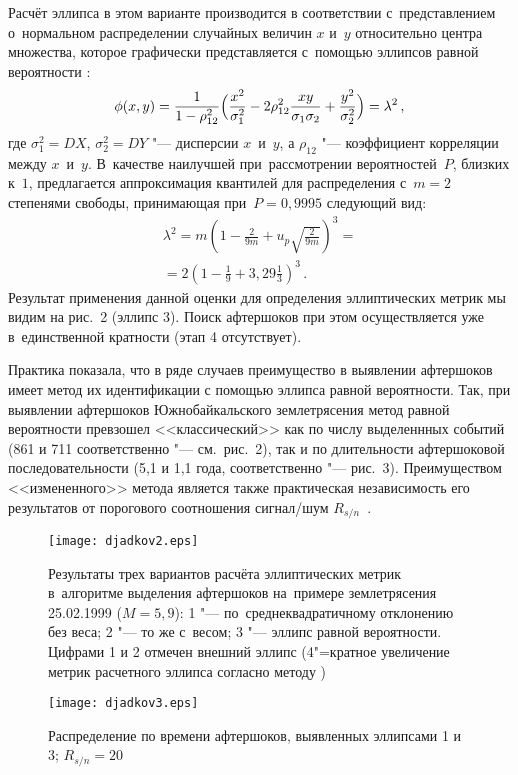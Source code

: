 \documentclass[twoside]{article}
\begin{document}
Расчёт эллипса в этом варианте производится в соответствии с~представлением о~нормальном
распределении случайных величин $x$ и~$y$ относительно центра множества, которое графически
представля\-ется с~помощью эллипсов равной вероятности \cite{author77}:
%
\[
    \phi(x,y) = \frac1{1- \rho^2_{12}} \Bigl(\frac{x^2}{\sigma^2_1}-2 \rho^2_{12} \frac{xy}{\sigma_1 \sigma_2}+\frac{y^2}{\sigma^2_2} \Bigr) = \lambda^2\,,
\]
%
где $\sigma^2_1=DX$, $\sigma^2_2=DY$ "--- дисперсии $x$~и~$y$, а $\rho_{12}$ "--- коэффициент
корреляции между $x$~и~$y$.
В~качестве наилучшей при~рассмотрении вероятностей~$P$,
близких к~$1$, предлагается \cite{author77} аппроксимация квантилей для распределения с~$m=2$
степенями свободы, принимающая при~$P=0{,}9995$ следующий вид:
\begin{multline*}
\lambda^2=m\left(1-\frac2{9m}+u_p\sqrt{\frac2{9m}}\right)^3=\\
=2\left(1-\frac19+3{,}29\frac13\right)^3\,.
\end{multline*}
Результат применения данной оценки для определения эллиптических метрик мы видим
на рис.~2 (эллипс 3).
Поиск афтершоков при этом осуществляется уже в~единственной
крат\-ности (этап 4 отсутствует).

Практика показала, что в ряде случаев преимущество в выявлении афтершоков имеет метод
их идентификации с помощью эллипса равной вероятности.
Так, при выявлении афтершоков
Южнобайкальского землетрясения метод равной вероятности превзошел <<классический>> как
по числу \mbox{выделеннных} событий (861 и 711 соответственно "--- см.\ рис.~2), так и по длительности
афтершоковой последовательности (5,1 и 1,1 года, соответственно "--- рис.~3).
Преимуществом
<<измененного>> метода является также практическая независимость его результатов
от порогового соотношения сигнал/шум $R_{s/n}$~\cite{author86}.

\begin{figure}[t]\centering
\texttt{[image: djadkov2.eps]}
\caption{Результаты трех вариантов расчёта эллиптических метрик в~алгоритме
выделения афтершоков на~примере землетрясения 25.02.1999 ($M=5{,}9$): 1 "--- по~среднеквадратичному
отклонению без веса; 2 "--- то же с~весом;  3 "--- эллипс равной вероятности.
Цифрами 1 и 2 отмечен внешний эллипс (4"=кратное увеличение метрик расчетного эллипса
согласно методу \cite{author86})}
\end{figure}

\begin{figure}[t]
\texttt{[image: djadkov3.eps]}
\caption{Распределение по времени афтершоков, выявленных эллипсами 1 и 3;
$R_{s/n}=20$}
\end{figure}
\end{document}
